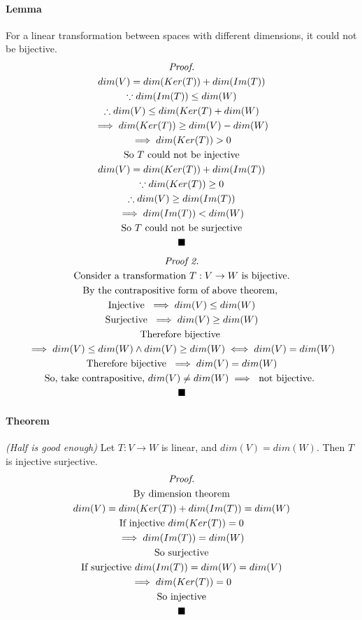 \documentclass[11pt]{article}
\newcommand{\trans}[3]{{#1}: {#2} \to {#3}}
\newcommand{\theorem}[0]{\paragraph{Theorem}}
\newcommand{\tx}[1]{\text{{#1}}}
\begin{document}
	\paragraph{Lemma} For a linear transformation between spaces with different dimensions, it could not be bijective.
	\begin{multline*}
		\emph{Proof.} \\
		dim(V) = dim(Ker(T)) + dim(Im(T)) \\
		\because dim(Im(T)) \leq dim(W) \\
		\therefore dim(V) \leq dim(Ker(T) + dim(W) \\
		\implies dim(Ker(T)) \geq dim(V) - dim(W) \\
		\implies dim(Ker(T)) > 0 \\
		\text{So $T$ could not be injective} \\
		dim(V) = dim(Ker(T)) + dim(Im(T)) \\
		\because dim(Ker(T)) \geq 0 \\
		\therefore dim(V) \geq dim(Im(T)) \\
		\implies dim(Im(T)) < dim(W) \\
		\text{So $T$ could not be surjective}\\
		\blacksquare
	\end{multline*}
	\begin{multline*}
		\emph{Proof 2.} \\
		\tx{Consider a transformation } \trans{T}{V}{W} \tx{ is bijective.} \\
		\tx{By the contrapositive form of above theorem, } \\
		\tx{Injective } \implies dim(V) \leq dim(W) \\
		\tx{Surjective } \implies dim(V) \geq dim(W) \\
		\tx{Therefore bijective }\\
		\implies dim(V) \leq dim(W) \land dim(V) \geq dim(W) \iff dim(V) = dim(W) \\
		\tx{Therefore bijective } \implies dim(V) = dim(W) \\
		\tx{So, take contrapositive, } dim(V) \neq dim(W) \implies \tx{ not bijective. }\\ 
		\blacksquare
	\end{multline*}
	\theorem \emph{(Half is good enough)} Let $T: V \to W$ is linear, and $dim(V) = dim(W)$. Then $T$ is injective  surjective.
	\begin{multline*}
		\emph{Proof.} \\
		\text{By dimension theorem} \\
		dim(V) = dim(Ker(T)) + dim(Im(T)) = dim(W) \\
		\text{If injective } dim(Ker(T)) = 0 \\
		\implies dim(Im(T)) = dim(W) \\
		\text{So surjective} \\
		\text{If surjective } dim(Im(T)) = dim(W) = dim(V) \\
		\implies dim(Ker(T)) = 0 \\
		\text{So injective} \\
		\blacksquare
	\end{multline*}
	
\end{document}
